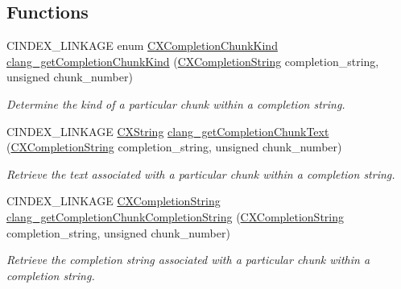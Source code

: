 \subsection*{Functions}
\begin{DoxyCompactItemize}
\item 
C\+I\+N\+D\+E\+X\+\_\+\+L\+I\+N\+K\+A\+GE enum \mbox{\hyperlink{group__CINDEX__CODE__COMPLET_ga82570056548565efdd6fc74e57e75bbd}{C\+X\+Completion\+Chunk\+Kind}} \mbox{\hyperlink{group__CINDEX__CODE__COMPLET_gac61e18c6d895d85f1476c6091d486091}{clang\+\_\+get\+Completion\+Chunk\+Kind}} (\mbox{\hyperlink{group__CINDEX__CODE__COMPLET_gafea23a43a60ec3b4f3bedccfbb76883a}{C\+X\+Completion\+String}} completion\+\_\+string, unsigned chunk\+\_\+number)
\begin{DoxyCompactList}\small\item\em Determine the kind of a particular chunk within a completion string. \end{DoxyCompactList}\item 
C\+I\+N\+D\+E\+X\+\_\+\+L\+I\+N\+K\+A\+GE \mbox{\hyperlink{structCXString}{C\+X\+String}} \mbox{\hyperlink{group__CINDEX__CODE__COMPLET_ga98d4c869dda8fd4b5386f62d02d6ba0b}{clang\+\_\+get\+Completion\+Chunk\+Text}} (\mbox{\hyperlink{group__CINDEX__CODE__COMPLET_gafea23a43a60ec3b4f3bedccfbb76883a}{C\+X\+Completion\+String}} completion\+\_\+string, unsigned chunk\+\_\+number)
\begin{DoxyCompactList}\small\item\em Retrieve the text associated with a particular chunk within a completion string. \end{DoxyCompactList}\item 
C\+I\+N\+D\+E\+X\+\_\+\+L\+I\+N\+K\+A\+GE \mbox{\hyperlink{group__CINDEX__CODE__COMPLET_gafea23a43a60ec3b4f3bedccfbb76883a}{C\+X\+Completion\+String}} \mbox{\hyperlink{group__CINDEX__CODE__COMPLET_ga3063e36e81b3e14809f87bdc841a3a9d}{clang\+\_\+get\+Completion\+Chunk\+Completion\+String}} (\mbox{\hyperlink{group__CINDEX__CODE__COMPLET_gafea23a43a60ec3b4f3bedccfbb76883a}{C\+X\+Completion\+String}} completion\+\_\+string, unsigned chunk\+\_\+number)
\begin{DoxyCompactList}\small\item\em Retrieve the completion string associated with a particular chunk within a completion string. \end{DoxyCompactList}\item 
\mbox{\label{group__CINDEX__CODE__COMPLET_ga76018aa1a7225268546e4d75dca5dbce}} 

\end{DoxyCompactItemize}
